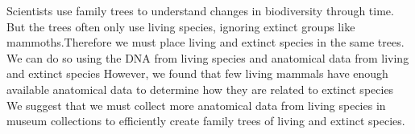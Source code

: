 \documentclass{article}
\begin{document}
Scientists use family trees to understand changes in biodiversity through time.
But the trees often only use living species, ignoring extinct groups like mammoths.Therefore we must place living and extinct species in the same trees.
We can do so using the DNA from living species and anatomical data from living and extinct species
However, we found that few living mammals have enough available anatomical data to determine how they are related to extinct species
We suggest that we must collect more anatomical data from living species in museum collections to efficiently create family trees of living and extinct species.
\end{document}
